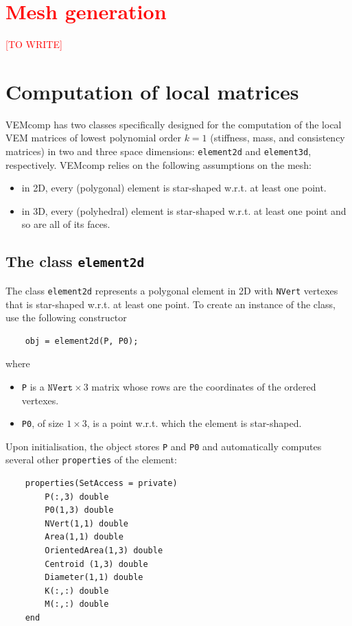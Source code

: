 \documentclass[a4paper]{article}
\newcommand{\red}[1]{\textcolor{red}{#1}}
\begin{document}
\section{\red{Mesh generation}}
\label{sec:mesh_generation}
\red{[TO WRITE]}


\section{Computation of local matrices}
\label{sec:computation_local_matrices}
VEMcomp has two classes specifically designed for the computation of the local VEM matrices of lowest polynomial order $k=1$ (stiffness, mass, and consistency matrices) in two and three space dimensions: \texttt{element2d} and \texttt{element3d}, respectively.  VEMcomp relies on the following assumptions on the mesh:
\begin{itemize}
\item in 2D, every (polygonal) element is star-shaped w.r.t. at least one point.
\item in 3D, every (polyhedral) element is star-shaped w.r.t. at least one point and so are all of its faces.
\end{itemize}

\subsection{The class \texttt{element2d}}
The class \texttt{element2d} represents a polygonal element in 2D with \texttt{NVert} vertexes that is star-shaped w.r.t. at least one point. To create an instance of the class, use the following constructor

\begin{lstlisting}
	obj = element2d(P, P0);
\end{lstlisting}
%
where
\begin{itemize}
\item \texttt{P} is a $\texttt{NVert} \times 3$ matrix whose rows are the coordinates of the ordered vertexes. 
\item \texttt{P0}, of size $1\times 3$, is a point w.r.t. which the element is star-shaped.
\end{itemize}

\noindent
Upon initialisation, the object stores \texttt{P} and \texttt{P0} and automatically computes several other \texttt{properties} of the element:

\begin{lstlisting}
	properties(SetAccess = private)
		P(:,3) double
		P0(1,3) double 
		NVert(1,1) double
		Area(1,1) double 
		OrientedArea(1,3) double
		Centroid (1,3) double
		Diameter(1,1) double
		K(:,:) double
		M(:,:) double
	end
\end{lstlisting}
\end{document}
